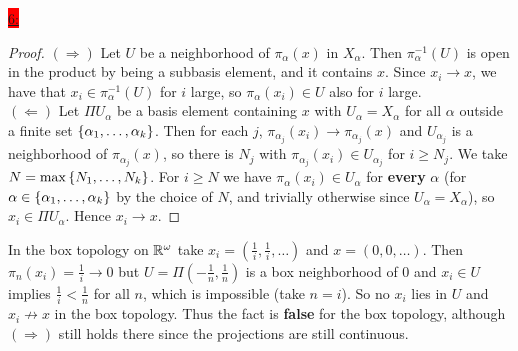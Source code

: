 \documentclass{exam}
\begin{document}
\colorbox{red}{\underline{6:}}
\begin{solution}
    \begin{proof}
        $(\Rightarrow)$ Let $U$ be a neighborhood of $\pi_{\alpha}(x)$ in $X_\alpha$. Then $\pi_{\alpha}^{-1}(U)$ is open in the product by being a subbasis element, and it contains $x$. Since $x_i \to x$, we have that $x_i \in \pi_{\alpha}^{-1}(U)$ for $i$ large, so $\pi_{\alpha}(x_i) \in U$ also for $i$ large. \\
        $(\Leftarrow)$ Let $\Pi U_\alpha$ be a basis element containing $x$ with $U_\alpha = X_\alpha$ for all $\alpha$ outside a finite set $\left\{\alpha_1, \dots, \alpha_k \right\}$. Then for each $j$, $\pi_{\alpha_{j}}(x_i) \to \pi_{\alpha_{j}}(x)$ and $U_{\alpha_{j}}$ is a neighborhood of $\pi_{\alpha_{j}}(x)$, so there is $N_j$ with $\pi_{\alpha_{j}}(x_i) \in U_{\alpha_{j}}$ for $i \geq N_j$. We take $N = \max\left\{N_1, \dots, N_k \right\}$. For $i \geq N$ we have $\pi_\alpha(x_i) \in U_\alpha$ for \textbf{every} $\alpha$ (for $\alpha \in \left\{\alpha_1, \dots, \alpha_k \right\}$ by the choice of $N$, and trivially otherwise since $U_\alpha = X_\alpha$), so $x_i \in \Pi U_\alpha$. Hence $x_i \to x$.
    \end{proof}

    In the box topology on $\mathbb R^{\omega}$ take $x_i = \left(\frac{1}{i}, \frac{1}{i}, \dots\right)$ and $x = (0, 0, \dots)$. Then $\pi_{n}(x_i) = \frac{1}{i} \to 0$ but $U = \Pi\left(-\frac{1}{n}, \frac{1}{n}\right)$ is a box neighborhood of $0$ and $x_i \in U$ implies $\frac{1}{i} < \frac{1}{n}$ for all $n$, which is impossible (take $n = i$). So no $x_i$ lies in $U$ and $x_i \not\to x$ in the box topology. Thus the fact is \textbf{false} for the box topology, although $(\Rightarrow)$ still holds there since the projections are still continuous.
\end{solution}
\end{document}
